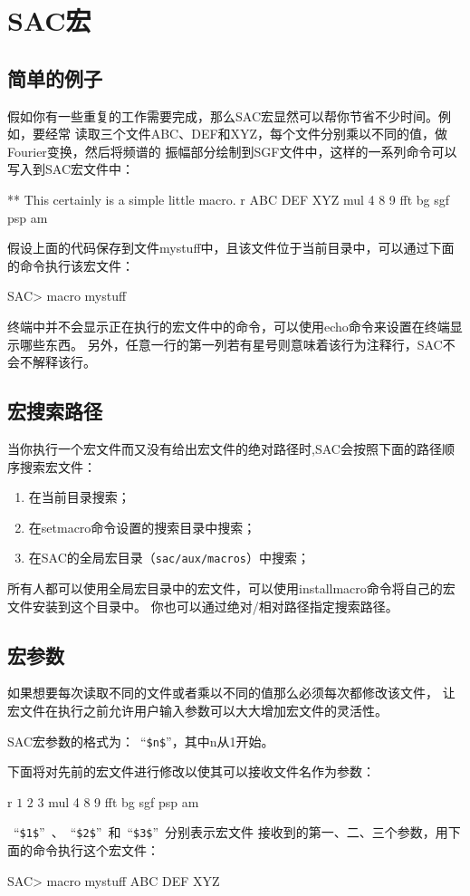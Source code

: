 \section{SAC宏}

\subsection{简单的例子}
假如你有一些重复的工作需要完成，那么SAC宏显然可以帮你节省不少时间。例如，要经常
读取三个文件ABC、DEF和XYZ，每个文件分别乘以不同的值，做Fourier变换，然后将频谱的
振幅部分绘制到SGF文件中，这样的一系列命令可以写入到SAC宏文件中：
\begin{SACCode}
** This certainly is a simple little macro.
r ABC DEF XYZ
mul 4 8 9
fft
bg sgf
psp am
\end{SACCode}

假设上面的代码保存到文件mystuff中，且该文件位于当前目录中，可以通过下面的命令执行该宏文件：
\begin{SACCode}
SAC> macro mystuff
\end{SACCode}
终端中并不会显示正在执行的宏文件中的命令，可以使用echo命令来设置在终端显示哪些东西。
另外，任意一行的第一列若有星号则意味着该行为注释行，SAC不会不解释该行。

\subsection{宏搜索路径}
当你执行一个宏文件而又没有给出宏文件的绝对路径时,SAC会按照下面的路径顺序搜索宏文件：
\begin{enumerate}
\item 在当前目录搜索；
\item 在setmacro命令设置的搜索目录中搜索；
\item 在SAC的全局宏目录（\texttt{sac/aux/macros}）中搜索；
\end{enumerate}

所有人都可以使用全局宏目录中的宏文件，可以使用installmacro命令将自己的宏文件安装到这个目录中。
你也可以通过绝对/相对路径指定搜索路径。

\subsection{宏参数}
如果想要每次读取不同的文件或者乘以不同的值那么必须每次都修改该文件，
让宏文件在执行之前允许用户输入参数可以大大增加宏文件的灵活性。

SAC宏参数的格式为：~``\lstinline{$n$}''，其中n从1开始。

下面将对先前的宏文件进行修改以使其可以接收文件名作为参数：
\begin{SACCode}
r $1$ $2$ $3$
mul 4 8 9
fft
bg sgf
psp am
\end{SACCode}
~``\lstinline{$1$}''~、~``\lstinline{$2$}''~和~``\lstinline{$3$}''~分别表示宏文件
接收到的第一、二、三个参数，用下面的命令执行这个宏文件：
\begin{SACCode}
SAC> macro mystuff ABC DEF XYZ 
\end{SACCode}

